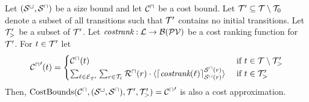 \begin{theorem}[CostBounds]
  Let ${({\mathcal{S}^\sqcup}, {\mathcal{S}^\sqcap})}$ be a size bound and let ${\mathcal{C}^\sqcap}$ be a cost bound.
  Let $\mathcal{T}' \subseteq \mathcal{T} \setminus \mathcal{T}_0$ denote a subset of all transitions such that $\mathcal{T}'$ contains no initial transitions.
  Let $\mathcal{T}'_>$ be a subset of $\mathcal{T}'$.
  Let $\emph{costrank}: \mathcal{L} \rightarrow \mathcal{B}(\mathcal{PV})$ be a cost ranking function for $\mathcal{T}'$.
  For $t \in \mathcal{T}'$ let
  \[ {\mathcal{C}^\sqcap}'(t) = 
  \begin{cases}
    {\mathcal{C}^\sqcap}(t) & \text{ if } t \in \mathcal{T} \setminus \mathcal{T}'_> \\
    \sum_{\ell \in \mathcal{E}_{\mathcal{T}'}} \sum_{r \in \mathcal{T}_\ell} {\mathcal{R}^\sqcap}(r) \cdot \langle\lceil \emph{costrank}(\ell) \rceil^{{\mathcal{S}^\sqcap}(r)}_{{\mathcal{S}^\sqcup}(r)}\rangle & \text{ if } t \in \mathcal{T}'_>
  \end{cases}
  \]
  Then, $\text{CostBounds}({\mathcal{C}^\sqcap}, {({\mathcal{S}^\sqcup}, {\mathcal{S}^\sqcap})}, \mathcal{T}', \mathcal{T}'_>) = {\mathcal{C}^\sqcap}'$ is also a cost approximation.
\end{theorem}
